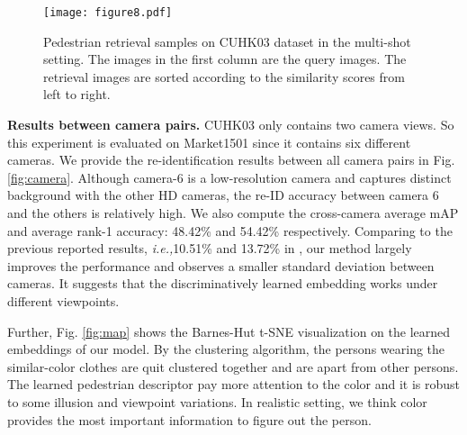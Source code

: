 \documentclass[journal]{IEEEtran}
\newcommand{\ie}{\mbox{\emph{i.e.,}}}
\begin{document}
\begin{figure}[t]
\begin{center}
\texttt{[image: figure8.pdf]}
\end{center}
   \caption{Pedestrian retrieval samples on CUHK03 dataset \cite{li2014deepreid} in the multi-shot setting. The images in the first column are the query images. The retrieval images are sorted according to the similarity scores from left to right.}
\label{fig:cuhk03}
\end{figure}

\textbf{Results between camera pairs.} 
CUHK03 \cite{li2014deepreid} only contains two camera views. So this experiment is evaluated on Market1501 \cite{zheng2015scalable} since it contains six different cameras. We provide the re-identification results between all camera pairs in Fig. \ref{fig:camera}. Although camera-6 is a  low-resolution camera and captures distinct background with the other HD cameras, the re-ID accuracy between camera 6 and the others is relatively high. We also compute the cross-camera average mAP and average rank-1 accuracy: 48.42\% and 54.42\% respectively. Comparing to the previous reported results, \ie 10.51\% and 13.72\% in \cite{zheng2015scalable}, our method largely improves the performance and observes a smaller standard deviation between cameras. It suggests that the discriminatively learned embedding works under different viewpoints.

Further, Fig. \ref{fig:map} shows the Barnes-Hut t-SNE visualization \cite{van2014accelerating} on the learned embeddings of our model. By the clustering algorithm, the persons wearing the similar-color clothes are quit clustered together and are apart from other persons.  The learned pedestrian descriptor pay more attention to the color and it is  robust to some illusion and viewpoint variations. In realistic setting, we think color provides the most important information to figure out the person.
\end{document}
